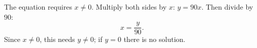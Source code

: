 The equation requires $x\ne0$. Multiply both sides by $x$: $y=90x$. Then divide by $90$:
\[
\boxed{x=\dfrac{y}{90}} .
\]
Since $x\ne0$, this needs $y\ne0$; if $y=0$ there is no solution.
